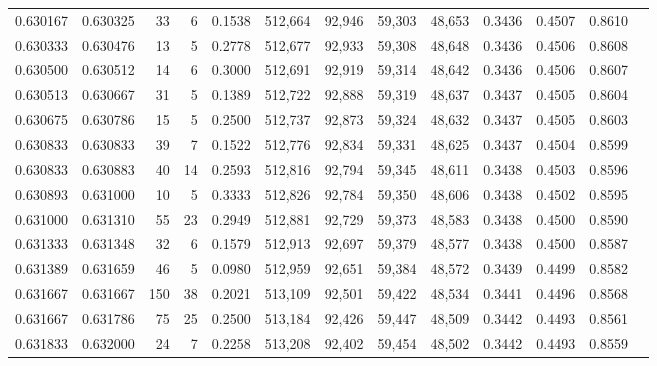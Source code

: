 \begin{tabular}{rrrrrrrrrrrrr}
0.630167 & 0.630325 &    33 &   6 &                                     0.1538 & 512,664 &  92,946 &  59,303 &  48,653 & 0.3436 & 0.4507 & 0.8610 \\
0.630333 & 0.630476 &    13 &   5 &                                     0.2778 & 512,677 &  92,933 &  59,308 &  48,648 & 0.3436 & 0.4506 & 0.8608 \\
0.630500 & 0.630512 &    14 &   6 &                                     0.3000 & 512,691 &  92,919 &  59,314 &  48,642 & 0.3436 & 0.4506 & 0.8607 \\
0.630513 & 0.630667 &    31 &   5 &                                     0.1389 & 512,722 &  92,888 &  59,319 &  48,637 & 0.3437 & 0.4505 & 0.8604 \\
0.630675 & 0.630786 &    15 &   5 &                                     0.2500 & 512,737 &  92,873 &  59,324 &  48,632 & 0.3437 & 0.4505 & 0.8603 \\
0.630833 & 0.630833 &    39 &   7 &                                     0.1522 & 512,776 &  92,834 &  59,331 &  48,625 & 0.3437 & 0.4504 & 0.8599 \\
0.630833 & 0.630883 &    40 &  14 &                                     0.2593 & 512,816 &  92,794 &  59,345 &  48,611 & 0.3438 & 0.4503 & 0.8596 \\
0.630893 & 0.631000 &    10 &   5 &                                     0.3333 & 512,826 &  92,784 &  59,350 &  48,606 & 0.3438 & 0.4502 & 0.8595 \\
0.631000 & 0.631310 &    55 &  23 &                                     0.2949 & 512,881 &  92,729 &  59,373 &  48,583 & 0.3438 & 0.4500 & 0.8590 \\
0.631333 & 0.631348 &    32 &   6 &                                     0.1579 & 512,913 &  92,697 &  59,379 &  48,577 & 0.3438 & 0.4500 & 0.8587 \\
0.631389 & 0.631659 &    46 &   5 &                                     0.0980 & 512,959 &  92,651 &  59,384 &  48,572 & 0.3439 & 0.4499 & 0.8582 \\
0.631667 & 0.631667 &   150 &  38 &                                     0.2021 & 513,109 &  92,501 &  59,422 &  48,534 & 0.3441 & 0.4496 & 0.8568 \\
0.631667 & 0.631786 &    75 &  25 &                                     0.2500 & 513,184 &  92,426 &  59,447 &  48,509 & 0.3442 & 0.4493 & 0.8561 \\
0.631833 & 0.632000 &    24 &   7 &                                     0.2258 & 513,208 &  92,402 &  59,454 &  48,502 & 0.3442 & 0.4493 & 0.8559 \\

\end{tabular}
